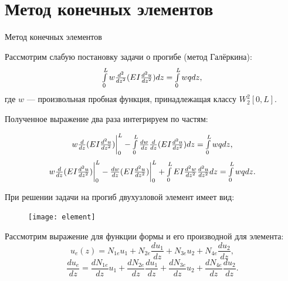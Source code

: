 \documentclass[7pt]{beamer}
\numberwithin{equation}{section}
\newcommand*{\Scale}[2][4]{\scalebox{#1}{$#2$}}
\begin{document}
\section{Метод конечных элементов}
\begin{frame}{Метод конечных элементов}
	\begin{block}{Рассмотрим слабую постановку задачи о прогибе (метод Галёркина):}
		\begin{equation}
			\label{beamm}
			\Scale[0.98]{\int\limits_{0}^{L}w\frac{d^{2}}{dz^{2}}(EI\frac{d^{2}u}{dz^{2}})dz=\int\limits_{0}^{L}wqdz,}
		\end{equation}
	где $w$ --- произвольная пробная функция, принадлежащая классу $W_{2}^{2}[0,L]$.
	\end{block}

	Полученное выражение два раза интегрируем по частям: 
	\begin{block}{}
	\[
		\Scale[0.98] {
			w\frac{d}{dz}(EI\frac{d^{2}u}{dz^{2}})\bigg|_0^L-\int\limits_{0}^{L}\frac{dw}{dz}\frac{d}{dz}(EI\frac{d^{2}u}{dz^{2}})dz=\int\limits_{0}^{L}wqdz,
		}
	\]
	\[
		\Scale[0.98] {
			w\frac{d}{dz}(EI\frac{d^{2}u}{dz^{2}})\bigg|_0^L-\frac{dw}{dz}(EI\frac{d^{2}u}{dz^{2}})\bigg|_0^L+\int\limits_{0}^{L}EI\frac{d^{2}w}{dz^{2}}\frac{d^{2}u}{dz^{2}}dz=\int\limits_{0}^{L}wqdz.
		}
	\]
	\end{block}
\end{frame}


\begin{frame}{}
	При решении задачи на прогиб двухузловой элемент имеет вид:
	\begin{figure}[h]
		\centering
		\texttt{[image: element]}
		\label{fig:element}
	\end{figure}
		
	\begin{block}{Рассмотрим выражение для функции формы и его производной для элемента:}
		\[u_e(z)=N_{1e}u_{1}+N_{2e}\frac{du_{1}}{dz}+N_{3e}u_{2}+N_{4e}\frac{du_{2}}{dz},\]
		\[\frac{du_e}{dz}=\frac{dN_{1e}}{dz}u_{1}+\frac{dN_{2e}}{dz}\frac{du_{1}}{dz}+\frac{dN_{3e}}{dz}u_{2}+\frac{dN_{4e}}{dz}\frac{du_{2}}{dz}.\]
	\end{block}
\end{frame}
\end{document}

